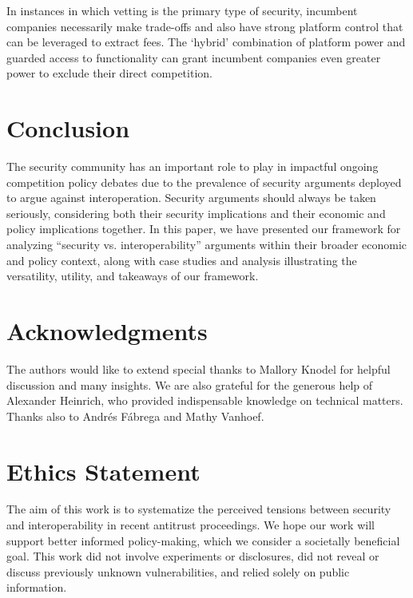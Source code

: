 \documentclass[letterpaper,twocolumn,10pt]{article}
\begin{document}
In instances in which vetting is the primary type of security, incumbent companies necessarily make trade-offs and also have strong platform control that can be leveraged to extract fees. The `hybrid' combination of platform power and guarded access to functionality can grant incumbent companies even greater power to exclude their direct competition.

\section{Conclusion}
\label{sec:conc}

The security community has an important role to play in impactful ongoing competition policy debates due to the prevalence of security arguments deployed to argue against interoperation.
Security arguments should always be taken seriously, considering both their security implications and their economic and policy implications together. In this paper, we have presented our framework for analyzing ``security vs. interoperability'' arguments within their broader economic and policy context, along with case studies and analysis illustrating the versatility, utility, and takeaways of our framework.



\iffullversion
    \section*{Acknowledgments}
    The authors would like to extend special thanks to Mallory Knodel for helpful discussion and many insights. We are also grateful for the generous help of Alexander Heinrich, who provided indispensable knowledge on technical matters.  Thanks also to Andrés Fábrega and Mathy Vanhoef.
\else
    \newpage
    \section*{Ethics Statement}
    The aim of this work is to systematize the perceived tensions between security and interoperability in recent antitrust proceedings. We hope our work will support better informed policy-making, which we consider a societally beneficial goal. This work did not involve experiments or disclosures, did not reveal or discuss previously unknown vulnerabilities, and relied solely on public information.
    
\end{document}
